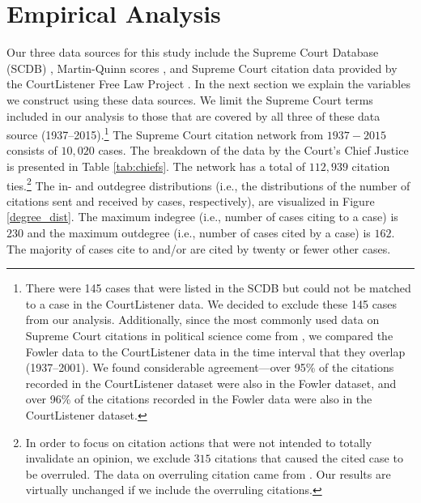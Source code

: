 \documentclass{cup-pan}
\begin{document}
 \section{Empirical Analysis}
Our three data sources for this study include the Supreme Court Database (SCDB) \citep{spaeth2014supreme}, Martin-Quinn scores \citep{martin2002dynamic}, and Supreme Court citation data provided by the CourtListener Free Law Project \citep{CourtListener}. In the next section we explain the variables we construct using these data sources. We limit the Supreme Court terms included in our analysis to those that are covered by all three of these data source (1937--2015).\footnote{There were 145 cases that were listed in the SCDB but could not be matched to a case in the CourtListener data. We decided to exclude these 145 cases from our analysis. Additionally, since the most commonly used data on Supreme Court citations in political science come from \citet{fowler2007network}, we compared the Fowler data to the CourtListener data in the time interval that they overlap (1937--2001). We found considerable agreement---over 95\% of the citations recorded in the CourtListener dataset were also in the Fowler dataset, and over 96\% of the citations recorded in the Fowler data were also in the CourtListener dataset.} The Supreme Court citation network from $1937 - 2015$ consists of $10,020$ cases. The breakdown of the data by the Court's Chief Justice is presented in Table \ref{tab:chiefs}. The network has a total of $112,939$ citation ties.\footnote{In order to focus on citation actions that were not intended to totally invalidate an opinion, we exclude $315$ citations that caused the cited case to be overruled. The data on overruling citation came from \citet{senate2016constitution}. Our results are virtually unchanged if we include the overruling citations.} The in- and outdegree distributions (i.e., the distributions of the number of citations sent and received by cases, respectively), are visualized in Figure \ref{degree_dist}. The maximum indegree (i.e., number of cases citing to a case) is $230$ and the maximum outdegree (i.e., number of cases cited by a case) is $162$. The majority of cases cite to and/or are cited by twenty or fewer other cases.
\end{document}
